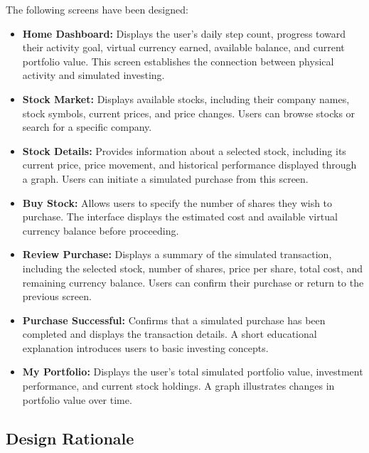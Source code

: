 \documentclass[12pt, titlepage]{article}
\begin{document}
The following screens have been designed:

\begin{itemize}

    \item \textbf{Home Dashboard:}
    Displays the user's daily step count, progress toward their
    activity goal, virtual currency earned, available balance,
    and current portfolio value. This screen establishes the
    connection between physical activity and simulated investing.

    \item \textbf{Stock Market:}
    Displays available stocks, including their company names,
    stock symbols, current prices, and price changes. Users can
    browse stocks or search for a specific company.

    \item \textbf{Stock Details:}
    Provides information about a selected stock, including its
    current price, price movement, and historical performance
    displayed through a graph. Users can initiate a simulated
    purchase from this screen.

    \item \textbf{Buy Stock:}
    Allows users to specify the number of shares they wish to
    purchase. The interface displays the estimated cost and
    available virtual currency balance before proceeding.

    \item \textbf{Review Purchase:}
    Displays a summary of the simulated transaction, including
    the selected stock, number of shares, price per share, total
    cost, and remaining currency balance. Users can confirm
    their purchase or return to the previous screen.

    \item \textbf{Purchase Successful:}
    Confirms that a simulated purchase has been completed and
    displays the transaction details. A short educational
    explanation introduces users to basic investing concepts.

    \item \textbf{My Portfolio:}
    Displays the user's total simulated portfolio value,
    investment performance, and current stock holdings.
    A graph illustrates changes in portfolio value over time.

\end{itemize}

\subsection{Design Rationale}
\end{document}
